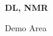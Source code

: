 \documentclass[a4paper]{article}
\begin{document}
\printGenericVSLHeader
\begin{center}
\begin{vsltext}{2.5cm}{4cm}

   \vspace{0.5cm} 

    \textbf{DL, NMR} 

    \vspace{1.5cm}

    Demo Area 

\end{vsltext}

\end{center}
\end{document}
